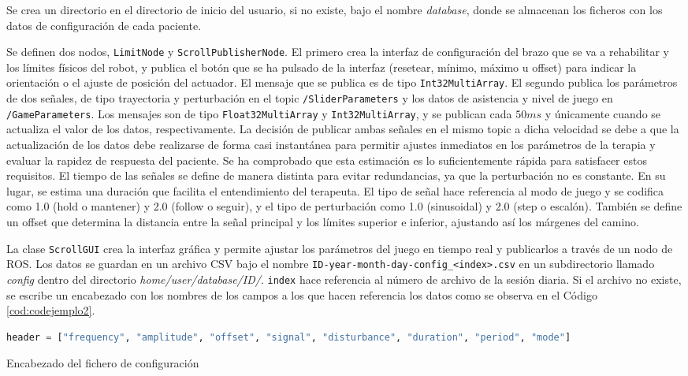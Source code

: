 Se crea un directorio en el directorio de inicio del usuario, si no existe, bajo el nombre \textit{database}, donde se almacenan los ficheros con los datos de configuración de cada paciente.

Se definen dos nodos, \verb|LimitNode| y \verb|ScrollPublisherNode|.
El primero crea la interfaz de configuración del brazo que se va a rehabilitar y los límites físicos del robot, y publica el botón que se ha pulsado de la interfaz (resetear, mínimo, máximo u offset) para indicar la orientación o el ajuste de posición del actuador.
El mensaje que se publica es de tipo \verb|Int32MultiArray|.
El segundo publica los parámetros de dos señales, de tipo trayectoria y perturbación en el topic \verb|/SliderParameters| y los datos de asistencia y nivel de juego en \verb|/GameParameters|.
Los mensajes son de tipo \verb|Float32MultiArray| y \verb|Int32MultiArray|, y se publican cada $50 ms$ y únicamente cuando se actualiza el valor de los datos, respectivamente.
La decisión de publicar ambas señales en el mismo topic a dicha velocidad se debe a que la actualización de los datos debe realizarse de forma casi instantánea para permitir ajustes inmediatos en los parámetros de la terapia y evaluar la rapidez de respuesta del paciente.
Se ha comprobado que esta estimación es lo suficientemente rápida para satisfacer estos requisitos.
El tiempo de las señales se define de manera distinta para evitar redundancias, ya que la perturbación no es constante.
En su lugar, se estima una duración que facilita el entendimiento del terapeuta.
El tipo de señal hace referencia al modo de juego y se codifica como 1.0 (hold o mantener) y 2.0 (follow o seguir), y el tipo de perturbación como 1.0 (sinusoidal) y 2.0 (step o escalón).
También se define un offset que determina la distancia entre la señal principal y los límites superior e inferior, ajustando así los márgenes del camino.

La clase \verb|ScrollGUI| crea la interfaz gráfica y permite ajustar los parámetros del juego en tiempo real y publicarlos a través de un nodo de ROS.
Los datos se guardan en un archivo CSV bajo el nombre \verb|ID-year-month-day-config_<index>.csv| en un subdirectorio llamado \textit{config} dentro del directorio \textit{home/user/database/ID/}.
\verb|index| hace referencia al número de archivo de la sesión diaria.
Si el archivo no existe, se escribe un encabezado con los nombres de los campos a los que hacen referencia los datos como se observa en el Código \ref{cod:codejemplo2}.

\begin{code}[h]
\begin{lstlisting}[language=Python]
header = ["frequency", "amplitude", "offset", "signal", "disturbance", "duration", "period", "mode"]
\end{lstlisting}
\caption[Encabezado del fichero de configuración]{Encabezado del fichero de configuración}
\label{cod:codejemplo2}
\end{code}


